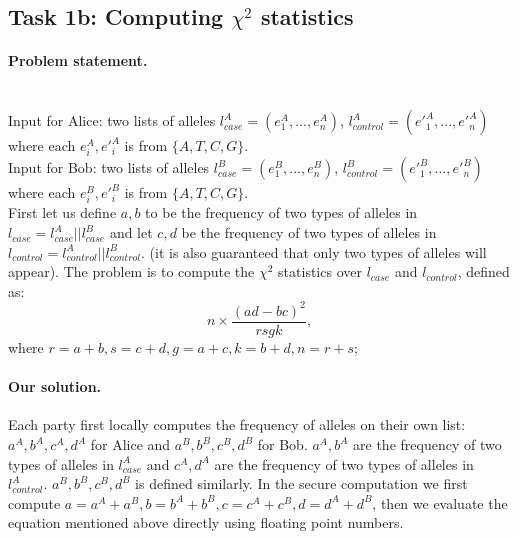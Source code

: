 \subsection*{Task 1b: Computing $\chi^2$ statistics}
\paragraph{Problem statement.}
~\\
Input for Alice: two lists of alleles $l^A_{case} = (e^A_1,...,e^A_n)$, $l^A_{control} = (e'^A_1,...,e'^A_n)$ where each $e^A_i, e'^A_i$ is from $\{A, T, C, G\}$.\\
Input for Bob: two lists of alleles $l^B_{case} = (e^B_1,...,e^B_n)$, $l^B_{control} = (e'^B_1,...,e'^B_n)$ where each $e^B_i, e'^B_i$ is from $\{A, T, C, G\}$.\\

First let us define $a, b$ to be the frequency of two types of alleles in
$l_{case} = l^A_{case} || l^B_{case}$ and let $c, d$ be the frequency of two types of alleles in
$l_{control} = l^A_{control} || l^B_{control}$. 
(it is also guaranteed
that only two types of alleles will appear). 
The problem is to compute the $\chi^2$ statistics over $l_{case}$ and $l_{control}$, defined as:
$$n\times\frac{(ad-bc)^2}{rsgk},$$
where $r = a + b, s = c + d, g = a + c, k = b + d, n =  r + s$; 


\paragraph{Our solution.}
Each party first locally computes the frequency of alleles on their own list: $a^A,b^A,c^A,d^A$ for Alice
and $a^B,b^B,c^B,d^B$ for Bob. $a^A,b^A$ are the frequency of two types of alleles in $l^A_{case}$ and 
$c^A,d^A$ are the frequency of two types of alleles in $l^A_{control}$. $a^B,b^B,c^B,d^B$  is defined similarly.
In the secure computation we first compute $a = a^A + a^B, b = b^A + b^B,
c = c^A + c^B,d = d^A + d^B$, then we evaluate the equation mentioned above directly using floating point
numbers.

